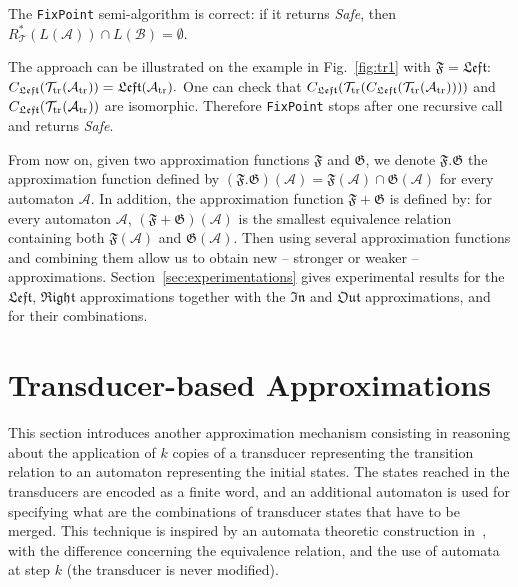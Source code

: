 \documentclass[]{llncs}
\def \A {\mathcal{A}}
\def \T {\mathcal{T}}
\def \B {\mathcal{B}}
\begin{document}
\begin{proposition}\label{prop-fixed}
The {\tt FixPoint}  semi-algorithm is correct: if it returns {\em Safe}, then $R_\T^*(L(\A))\cap L(\B)= \emptyset$.
\end{proposition}
 





The approach can be illustrated on the example in Fig.~\ref{fig:tr1} with
$\mathfrak{F}=\mathfrak{Left}$: $C_\mathfrak{Left}(\T_{\rm tr}(\A_{\rm
  tr}))=\mathfrak{Left}(\A_{\rm tr}).$ One can check that
 $C_\mathfrak{Left}(\T_{\rm tr}(C_\mathfrak{Left}(\T_{\rm tr}(\A_{\rm
  tr}))))$ and $C_\mathfrak{Left}(\T_{\rm tr}(\A_{\rm
  tr}))$ are isomorphic. Therefore {\tt FixPoint} stops after one
recursive call and returns {\it Safe}.



From now on, given two approximation functions $\mathfrak{F}$ and
$\mathfrak{G}$, we denote $\mathfrak{F}.\mathfrak{G}$ the
approximation function defined by
$(\mathfrak{F}.\mathfrak{G})(\A)=\mathfrak{F}(\A)\cap
\mathfrak{G}(\A)$ for every automaton $\A$. In addition, the
approximation function $\mathfrak{F}+\mathfrak{G}$ is defined by: for
every automaton $\A$, $(\mathfrak{F}+\mathfrak{G})(\A)$ is the
smallest equivalence relation containing both $\mathfrak{F}(\A)$ and
$\mathfrak{G}(\A)$. Then using several approximation functions and
combining them allow us to obtain new -- stronger or weaker --
approximations. Section~\ref{sec:experimentations}
gives experimental results for the $\mathfrak{Left}$, $\mathfrak{Right}$ approximations together with the $\mathfrak{In}$ and $\mathfrak{Out}$ approximations, and for their combinations. 




\section{Transducer-based Approximations}
\label{transducer-based-approximations}

This section introduces another approximation mechanism consisting in
reasoning about the application of $k$ copies of a transducer
representing the transition relation to an automaton representing the initial states.  The states reached in the transducers are encoded as a finite word, and an additional automaton is used for specifying
what are the combinations of transducer states that have to be
merged. This technique is inspired by an automata theoretic construction in~\cite{bouajjani_regular_2000}, 
with the difference concerning the equivalence relation, and the use of automata at step $k$ (the transducer is never modified).  
\end{document}
